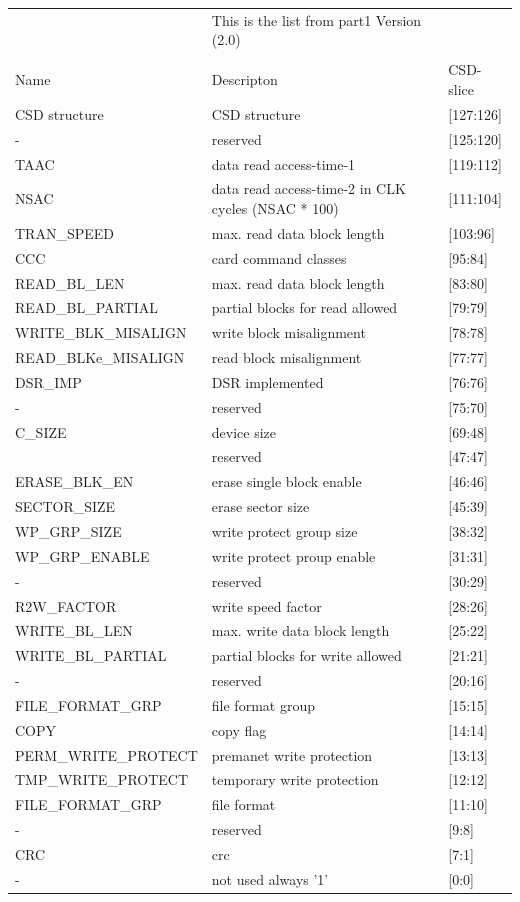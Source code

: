 \documentclass[]{article}
\begin{document}
\begin{tabular}{|l|l|l|}
&This is the list from part1 Version (2.0)& \\
&& \\
Name &Descripton&CSD-slice \\
CSD structure&CSD structure&[127:126] \\
-&reserved&[125:120] \\
TAAC&data read access-time-1&[119:112] \\
NSAC&data read access-time-2 in CLK cycles (NSAC * 100)&[111:104] \\
TRAN\_SPEED&max. read data block length&[103:96] \\
CCC&card command classes&[95:84] \\
READ\_BL\_LEN&max. read data block length&[83:80] \\
READ\_BL\_PARTIAL&partial blocks for read allowed&[79:79] \\
WRITE\_BLK\_MISALIGN&write block misalignment&[78:78] \\
READ\_BLKe\_MISALIGN&read block misalignment&[77:77] \\
DSR\_IMP&DSR implemented&[76:76] \\
-&reserved&[75:70] \\
C\_SIZE&device size&[69:48] \\
&reserved&[47:47] \\
ERASE\_BLK\_EN&erase single block enable&[46:46] \\
SECTOR\_SIZE&erase sector size&[45:39] \\
WP\_GRP\_SIZE&write protect group size&[38:32] \\
WP\_GRP\_ENABLE&write protect proup enable&[31:31] \\
-&reserved&[30:29] \\
R2W\_FACTOR&write speed factor&[28:26]  \\
WRITE\_BL\_LEN&max. write data block length&[25:22] \\
WRITE\_BL\_PARTIAL&partial blocks for write allowed&[21:21] \\
-&reserved&[20:16]  \\
FILE\_FORMAT\_GRP&file format group&[15:15] \\
COPY&copy flag&[14:14] \\
PERM\_WRITE\_PROTECT&premanet write protection&[13:13] \\
TMP\_WRITE\_PROTECT&temporary write protection&[12:12] \\
FILE\_FORMAT\_GRP&file format&[11:10] \\
-&reserved&[9:8] \\
CRC&crc&[7:1] \\
-&not used always '1'&[0:0] \\
\end{tabular}
\end{document}
